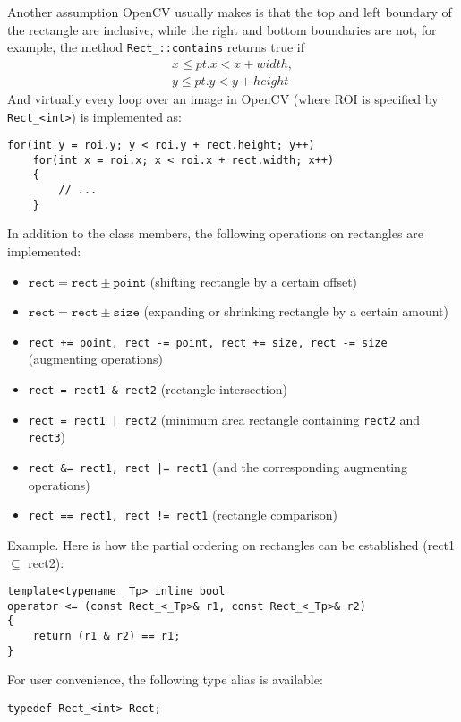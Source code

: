 Another assumption OpenCV usually makes is that the top and left boundary of the rectangle are inclusive, while the right and bottom boundaries are not, for example, the method \texttt{Rect\_::contains} returns true if
\begin{eqnarray*}
      x \leq pt.x < x+width,\\
      y \leq pt.y < y+height
\end{eqnarray*}
And virtually every loop over an image  in OpenCV (where ROI is specified by \texttt{Rect\_<int>}) is implemented as:
\begin{lstlisting}
for(int y = roi.y; y < roi.y + rect.height; y++)
    for(int x = roi.x; x < roi.x + rect.width; x++)
    {
        // ...
    }
\end{lstlisting}

In addition to the class members, the following operations on rectangles are implemented:
\begin{itemize}
    \item $\texttt{rect} = \texttt{rect} \pm \texttt{point}$ (shifting rectangle by a certain offset)
    \item $\texttt{rect} = \texttt{rect} \pm \texttt{size}$ (expanding or shrinking rectangle by a certain amount)
    \item \texttt{rect += point, rect -= point, rect += size, rect -= size} (augmenting operations)
    \item \texttt{rect = rect1 \& rect2} (rectangle intersection)
    \item \texttt{rect = rect1 | rect2} (minimum area rectangle containing \texttt{rect2} and \texttt{rect3})
    \item \texttt{rect \&= rect1, rect |= rect1} (and the corresponding augmenting operations)
    \item \texttt{rect == rect1, rect != rect1} (rectangle comparison)
\end{itemize}

Example. Here is how the partial ordering on rectangles can be established (rect1 $\subseteq$ rect2):
\begin{lstlisting}
template<typename _Tp> inline bool
operator <= (const Rect_<_Tp>& r1, const Rect_<_Tp>& r2)
{
    return (r1 & r2) == r1;
}
\end{lstlisting}

For user convenience, the following type alias is available:
\begin{lstlisting}
typedef Rect_<int> Rect;
\end{lstlisting}

